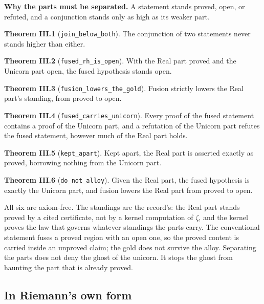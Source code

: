 \documentclass[10pt]{article}
\begin{document}
\textbf{Why the parts must be separated.} A statement stands proved,
open, or refuted, and a conjunction stands only as high as its weaker
part.

\textbf{Theorem III.1} (\texttt{join\_below\_both}). The conjunction of
two statements never stands higher than either.

\textbf{Theorem III.2} (\texttt{fused\_rh\_is\_open}). With the Real
part proved and the Unicorn part open, the fused hypothesis stands open.

\textbf{Theorem III.3} (\texttt{fusion\_lowers\_the\_gold}). Fusion
strictly lowers the Real part's standing, from proved to open.

\textbf{Theorem III.4} (\texttt{fused\_carries\_unicorn}). Every proof
of the fused statement contains a proof of the Unicorn part, and a
refutation of the Unicorn part refutes the fused statement, however much
of the Real part holds.

\textbf{Theorem III.5} (\texttt{kept\_apart}). Kept apart, the Real part
is asserted exactly as proved, borrowing nothing from the Unicorn part.

\textbf{Theorem III.6} (\texttt{do\_not\_alloy}). Given the Real part,
the fused hypothesis is exactly the Unicorn part, and fusion lowers the
Real part from proved to open.

All six are axiom-free. The standings are the record's: the Real part
stands proved by a cited certificate, not by a kernel computation of
\(\zeta\), and the kernel proves the law that governs whatever standings
the parts carry. The conventional statement fuses a proved region with
an open one, so the proved content is carried inside an unproved claim;
the gold does not survive the alloy. Separating the parts does not deny
the ghost of the unicorn. It stops the ghost from haunting the part that
is already proved.

\hypertarget{in-riemanns-own-form}{%
\subsection{In Riemann's own form}\label{in-riemanns-own-form}}
\end{document}
